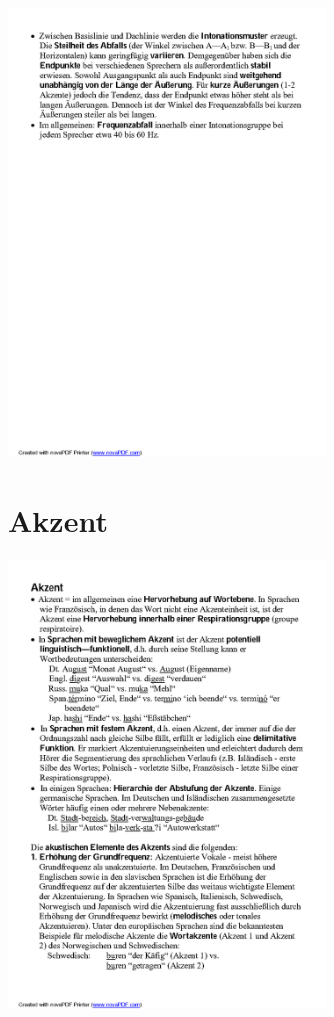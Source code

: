 \documentclass[
  letterpaper,
]{scrbook}
\begin{document}
\includegraphics[width=3.31in,height=\textheight]{./pictures/prosodie/06_Prosodie_Folie_2005-06_R_Page7.png}

\hypertarget{akzent}{%
\section{Akzent}\label{akzent}}

\includegraphics[width=3.31in,height=\textheight]{./pictures/prosodie/06_Prosodie_Folie_2005-06_R_Page8.png}
\end{document}
